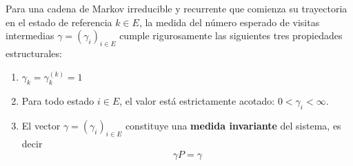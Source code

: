\begin{teo}
    Para una cadena de Markov irreducible y recurrente que comienza su trayectoria en el estado de referencia $k \in E$, la medida del número esperado de visitas intermedias $\gamma = (\gamma_i)_{i \in E}$ cumple rigurosamente las siguientes tres propiedades estructurales:
    \begin{enumerate}
        \item $\gamma_k = \gamma_k^{(k)} = 1$
        \item Para todo estado $i \in E$, el valor está estrictamente acotado: $0 < \gamma_i < \infty$.
        \item El vector $\gamma = (\gamma_i)_{i \in E}$ constituye una \textbf{medida invariante} del sistema, es decir
        \begin{equation*}
            \gamma P =\gamma
        \end{equation*}
    \end{enumerate}


\end{teo}
